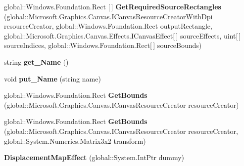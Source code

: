 \begin{DoxyCompactItemize}
global\+::\+Windows.\+Foundation.\+Rect \mbox{[}$\,$\mbox{]} {\bfseries Get\+Required\+Source\+Rectangles} (global\+::\+Microsoft.\+Graphics.\+Canvas.\+I\+Canvas\+Resource\+Creator\+With\+Dpi resource\+Creator, global\+::\+Windows.\+Foundation.\+Rect output\+Rectangle, global\+::\+Microsoft.\+Graphics.\+Canvas.\+Effects.\+I\+Canvas\+Effect\mbox{[}$\,$\mbox{]} source\+Effects, uint\mbox{[}$\,$\mbox{]} source\+Indices, global\+::\+Windows.\+Foundation.\+Rect\mbox{[}$\,$\mbox{]} source\+Bounds)
\item 
\mbox{\label{class_microsoft_1_1_graphics_1_1_canvas_1_1_effects_1_1_displacement_map_effect_afb003ab3be9435ec335ee537977f1d29}} 
string {\bfseries get\+\_\+\+Name} ()
\item 
\mbox{\label{class_microsoft_1_1_graphics_1_1_canvas_1_1_effects_1_1_displacement_map_effect_ab487b040a6866d4895664025280310b5}} 
void {\bfseries put\+\_\+\+Name} (string name)
\item 
\mbox{\label{class_microsoft_1_1_graphics_1_1_canvas_1_1_effects_1_1_displacement_map_effect_a2e6badea68c005f4b53a34c1bc09a0cd}} 
global\+::\+Windows.\+Foundation.\+Rect {\bfseries Get\+Bounds} (global\+::\+Microsoft.\+Graphics.\+Canvas.\+I\+Canvas\+Resource\+Creator resource\+Creator)
\item 
\mbox{\label{class_microsoft_1_1_graphics_1_1_canvas_1_1_effects_1_1_displacement_map_effect_ae496e3721b3056df38f4cf85aac6cabe}} 
global\+::\+Windows.\+Foundation.\+Rect {\bfseries Get\+Bounds} (global\+::\+Microsoft.\+Graphics.\+Canvas.\+I\+Canvas\+Resource\+Creator resource\+Creator, global\+::\+System.\+Numerics.\+Matrix3x2 transform)
\item 
\mbox{\label{class_microsoft_1_1_graphics_1_1_canvas_1_1_effects_1_1_displacement_map_effect_ae0d7553bd7b893a6a8c39c315ffc0105}} 
{\bfseries Displacement\+Map\+Effect} (global\+::\+System.\+Int\+Ptr dummy)
\item 
\mbox{\label{class_microsoft_1_1_graphics_1_1_canvas_1_1_effects_1_1_displacement_map_effect_a3bc67d76982886e7a8944528ef1e212c}} 

\end{DoxyCompactItemize}
